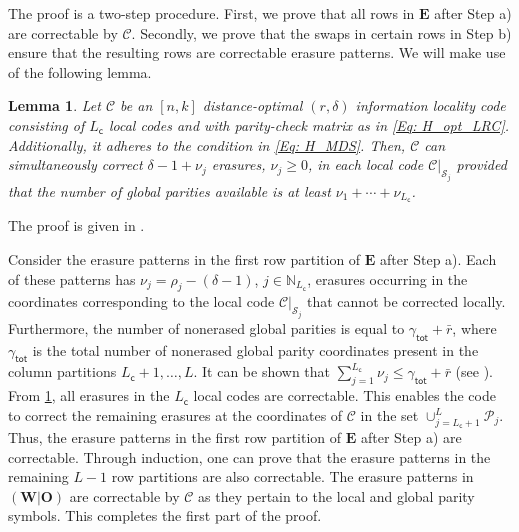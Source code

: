 \documentclass[twocolumn,conference]{IEEEtran}
\newtheorem{lemma}{Lemma}
\newcommand{\set}[1]{\mathcal{#1}}           %
\newcommand{\Nat}[1]{\mathbb{N}_{#1}}        %
\newcommand{\code}[1]{\mathcal{#1}}          %
\begin{document}
The proof is a two-step procedure. First, we prove that all rows in $\bm E$ after Step a) are correctable by $\mathcal C$. Secondly, we prove that the swaps in certain rows in Step b) ensure that the resulting rows are correctable erasure patterns. We will make use of the following lemma.
\begin{lemma}
  \label{Lem: Capacity_LRC}
  Let $\mathcal C$ be an $[n,k]$ distance-optimal $(r,\delta)$ information locality code consisting of ${L_{\mathsf c}}$ local codes and with  parity-check   matrix as in \cref{Eq: H_opt_LRC}. Additionally, it adheres to the condition in \cref{Eq: H_MDS}. Then, $\mathcal C$ can   simultaneously correct $\delta-1+\nu_j$ erasures, $\nu_j\geq0$, in each local code $\code{C}|_{\set{S}_j}$ provided that the number of   global parities available is at least $\nu_1+\cdots+\nu_{L_{\mathsf{c}}}$.
\end{lemma}
\begin{IEEEproof}
The proof is given in  \cite[App.~F]{KumarLinRosnesGraell17_1sub}.	
\end{IEEEproof}

Consider the erasure patterns in the first row partition of $\bm E$ after Step a). Each of these patterns has $\nu_j=\rho_j-(\delta-1)$, $j\in\Nat{L_{\mathsf{c}}}$, erasures occurring in the coordinates corresponding to the local code $\code{C}|_{\set{S}_j}$ that cannot be corrected locally. Furthermore, the number of nonerased global parities is equal to $\gamma_{\mathsf{tot}}+\bar{r}$, where $\gamma_{\mathsf{tot}}$ is the total number of nonerased global parity coordinates present in the column partitions $L_{\mathsf c}+1,\ldots,L$. It can be shown that $\sum_{j=1}^{L_{\mathsf c}}\nu_j\leq \gamma_{\mathsf{tot}}+\bar{r}$ (see \cite[proof of Lem.~8]{KumarLinRosnesGraell17_1sub}). From \cref{Lem: Capacity_LRC}, all erasures in the $L_{\mathsf c}$ local codes are correctable. This enables the code to correct the remaining erasures at the coordinates of $\mathcal C$ in the set $\cup_{j=L_{\mathsf c}+1}^{L} \mathcal P_j$. Thus, the erasure patterns in the first row partition of $\bm E$ after Step a) are correctable. Through induction, one can prove that the erasure patterns in the remaining $L-1$ row partitions are also correctable. The erasure patterns in $(\bm W|\bm O)$ are correctable by $\mathcal C$ as they pertain to the local and global parity symbols. This completes the first part of the proof.
\end{document}

